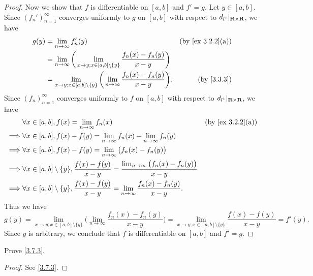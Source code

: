 \begin{proof}
  Now we show that \(f\) is differentiable on \([a, b]\) and \(f' = g\).
  Let \(y \in [a, b]\).
  Since \((f_n')_{n = 1}^\infty\) converges uniformly to \(g\) on \([a, b]\) with respect to \(d_{l^1}|_{\mathbf{R} \times \mathbf{R}}\), we have
  \begin{align*}
    g(y) & = \lim_{n \to \infty} f_n'(y)                                                                                  & \text{(by \cref{ex 3.2.2}(a))} \\
         & = \lim_{n \to \infty} \bigg(\lim_{x \to y ; x \in [a, b] \setminus \{y\}} \frac{f_n(x) - f_n(y)}{x - y}\bigg)                                   \\
         & = \lim_{x \to y ; x \in [a, b] \setminus \{y\}} \bigg(\lim_{n \to \infty} \frac{f_n(x) - f_n(y)}{x - y}\bigg). & \text{(by \cref{3.3.3})}
  \end{align*}
  Since \((f_n)_{n = 1}^\infty\) converges uniformly to \(f\) on \([a, b]\) with respect to \(d_{l^1}|_{\mathbf{R} \times \mathbf{R}}\), we have
  \begin{align*}
             & \forall x \in [a, b], f(x) = \lim_{n \to \infty} f_n(x)                                                                       & \text{(by \cref{ex 3.2.2}(a))} \\
    \implies & \forall x \in [a, b], f(x) - f(y) = \lim_{n \to \infty} f_n(x) - \lim_{n \to \infty} f_n(y)                                                                    \\
    \implies & \forall x \in [a, b], f(x) - f(y) = \lim_{n \to \infty} \big(f_n(x) - f_n(y)\big)                                                                              \\
    \implies & \forall x \in [a, b] \setminus \{y\}, \frac{f(x) - f(y)}{x - y} = \frac{\lim_{n \to \infty} \big(f_n(x) - f_n(y)\big)}{x - y}                                  \\
    \implies & \forall x \in [a, b] \setminus \{y\}, \frac{f(x) - f(y)}{x - y} = \lim_{n \to \infty} \frac{f_n(x) - f_n(y)}{x - y}.
  \end{align*}
  Thus we have
  \[
    g(y) = \lim_{x \to y ; x \in [a, b] \setminus \{y\}} \bigg(\lim_{n \to \infty} \frac{f_n(x) - f_n(y)}{x - y}\bigg) = \lim_{x \to y ; x \in [a, b] \setminus \{y\}} \frac{f(x) - f(y)}{x - y} = f'(y).
  \]
  Since \(y\) is arbitrary, we conclude that \(f\) is differentiable on \([a, b]\) and \(f' = g\).
\end{proof}

\begin{exercise}\label{ex 3.7.3}
  Prove \cref{3.7.3}.
\end{exercise}

\begin{proof}
  See \cref{3.7.3}.
\end{proof}